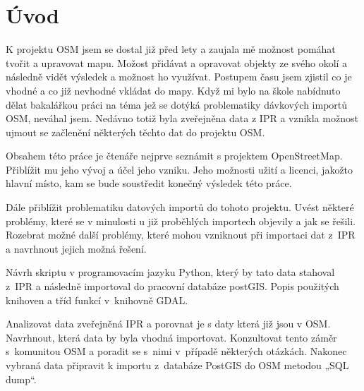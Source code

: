 \chapter{Úvod}
\label{1-uvod}

K projektu OSM jsem se dostal již před lety a zaujala mě možnost pomáhat tvořit 
a upravovat mapu. Možost přidávat a opravovat objekty ze svého okolí a následně 
vidět výsledek a možnost ho využívat. Postupem času jsem zjistil co je vhodné a 
co již nevhodné vkládat do mapy. Když mi bylo na škole nabídnuto dělat 
bakalářkou práci na téma jež se dotýká problematiky dávkových importů OSM, 
neváhal jsem. Nedávno totiž byla zveřejněna data z IPR a vznikla možnost ujmout 
se začlenění některých těchto dat do projektu OSM. 

Obsahem této práce je čtenáře nejprve seznámit s projektem OpenStreetMap. 
Přiblížit mu jeho vývoj a účel jeho vzniku. Jeho možnosti užití a licenci, 
jakožto hlavní místo, kam se bude soustředit konečný výsledek této práce.

Dále přiblížit problematiku datových importů do tohoto projektu. Uvést některé 
problémy, které se v minulosti u již proběhlých importech objevily a jak se 
řešili. Rozebrat možné další problémy, které mohou vzniknout při importaci dat 
z~IPR a navrhnout jejich možná řešení. 

Návrh skriptu v programovacím jazyku Python, který by tato data stahoval z~IPR 
a následně importoval do pracovní databáze postGIS. Popis použitých knihoven a 
tříd funkcí v~knihovně GDAL.

Analizovat data zveřejněná IPR a porovnat je s daty která již jsou v OSM. 
Navrhnout, která data by byla vhodná importovat. Konzultovat tento záměr 
s~komunitou OSM a poradit se s~nimi v~případě některých otázkách. Nakonec 
vybraná data připravit k importu z~databáze PostGIS do OSM metodou „SQL dump“.
